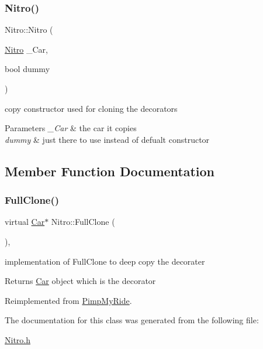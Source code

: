\subsubsection{\texorpdfstring{Nitro()}{Nitro()}\hspace{0.1cm}{\footnotesize\ttfamily [2/2]}}
{\footnotesize\ttfamily Nitro\+::\+Nitro (\begin{DoxyParamCaption}\item[{\mbox{\hyperlink{class_nitro}{Nitro}}}]{\+\_\+\+Car,  }\item[{bool}]{dummy }\end{DoxyParamCaption})\hspace{0.3cm}{\ttfamily [inline]}}

copy constructor used for cloning the decorators 
\begin{DoxyParams}{Parameters}
{\em \+\_\+\+Car} & the car it copies \\
\hline
{\em dummy} & just there to use instead of defualt constructor \\
\hline
\end{DoxyParams}


\subsection{Member Function Documentation}
\mbox{\label{class_nitro_a1574264a8ca8691bb3669c8a3a3ad5dd}} 
\subsubsection{\texorpdfstring{Full\+Clone()}{FullClone()}}
{\footnotesize\ttfamily virtual \mbox{\hyperlink{class_car}{Car}}$\ast$ Nitro\+::\+Full\+Clone (\begin{DoxyParamCaption}{ }\end{DoxyParamCaption})\hspace{0.3cm}{\ttfamily [inline]}, {\ttfamily [virtual]}}

implementation of Full\+Clone to deep copy the decorater \begin{DoxyReturn}{Returns}
\mbox{\hyperlink{class_car}{Car}} object which is the decorator 
\end{DoxyReturn}


Reimplemented from \mbox{\hyperlink{class_pimp_my_ride_afce12a1a761727eebec707924521d0e2}{Pimp\+My\+Ride}}.



The documentation for this class was generated from the following file\+:\begin{DoxyCompactItemize}
\item 
\mbox{\hyperlink{_nitro_8h}{Nitro.\+h}}\end{DoxyCompactItemize}
